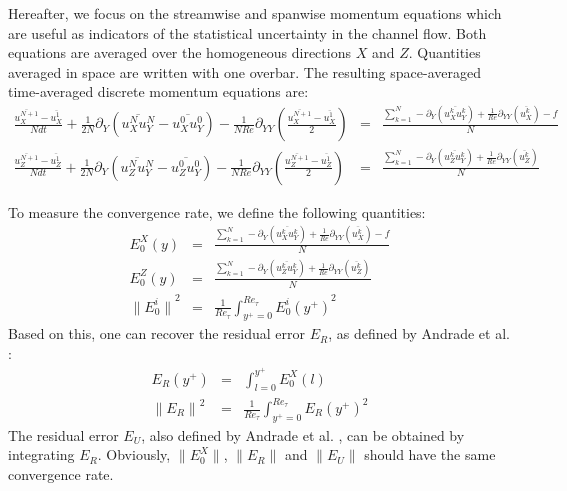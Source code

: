 \documentclass[aip,pof,reprint]{revtex4-1}
\begin{document}
\begin{widetext}
{%
Hereafter, we focus on the streamwise and spanwise momentum equations which are useful as indicators of the statistical uncertainty in the channel flow.
Both equations are averaged over the homogeneous directions $X$ and $Z$.
Quantities averaged in space are written with one overbar.
The resulting space-averaged time-averaged discrete momentum equations are:
\begin{eqnarray}
\label{qdm_sum_x}
\frac{\overline{u_X^{N+1}}-\overline{u_X^1}}{Ndt}
+ \frac{1}{2N} \partial_Y \left( \overline{u_X^{N} u_Y^{N}} - \overline{u_X^0 u_Y^0} \right)
- \frac{1}{NRe} \partial_{YY} \left( \frac{\overline{u_X^{N+1}} - \overline{u_X^1}}{2}\right)
& = & \frac{ \sum_{k=1}^N
- \partial_Y \left( \overline{u_X^k u_Y^k} \right)
+ \frac{1}{Re} \partial_{YY} \left( \overline{u_X^k} \right)
- f}{N} \\
\label{qdm_sum_z}
\frac{\overline{u_Z^{N+1}}-\overline{u_Z^1}}{Ndt}
+ \frac{1}{2N} \partial_Y \left( \overline{u_Z^{N} u_Y^{N}} - \overline{u_Z^0 u_Y^0} \right)
- \frac{1}{NRe} \partial_{YY} \left( \frac{\overline{u_Z^{N+1}} - \overline{u_Z^1}}{2}\right)
& = & \frac{\sum_{k=1}^N
- \partial_Y \left( \overline{u_Z^k u_Y^k} \right)
+ \frac{1}{Re} \partial_{YY} \left( \overline{u_Z^k}\right)}{N}
\end{eqnarray}
}
\end{widetext}

To measure the convergence rate, we define the following quantities:
\begin{eqnarray}
E_0^X\left(y\right) & = & \frac{\sum_{k=1}^N -\partial_Y \left( \overline{u_X^k u_Y^k} \right)+\frac{1}{Re}\partial_{YY}\left( \overline{u_X^k} \right)-f}{N} \nonumber \\
E_0^Z\left(y\right) & = & \frac{\sum_{k=1}^N -\partial_Y \left( \overline{u_Z^k u_Y^k} \right)+\frac{1}{Re}\partial_{YY}\left( \overline{u_Z^k} \right)}{N} \nonumber \\
{\parallel{E_0^i}\parallel}^2 & = & \frac{1}{{Re}_\tau} \int_{y^+=0}^{{Re}_\tau} {E_0^i\left(y^+\right)}^2
\end{eqnarray}
Based on this, one can recover the residual error $E_R$, as defined by Andrade et al. \citep{andrade}:
\begin{eqnarray}
\label{definition_ER}
E_R \left(y^+\right) & = & \int_{l=0}^{y^+} E_0^X\left(l\right)  \\
{\parallel{E_R}\parallel}^2 & = & \frac{1}{{Re}_\tau} \int_{y^+=0}^{{Re}_\tau} {E_R \left(y^+\right)}^2
\end{eqnarray}
{\color{red} The residual error $E_U$, also defined by Andrade et al. \citep{andrade}, can be obtained by integrating $E_R$.
Obviously, $\parallel{E_0^X}\parallel$, $\parallel{E_R}\parallel$ and $\parallel {E_U} \parallel $ should have the same convergence rate.
}
\end{document}
